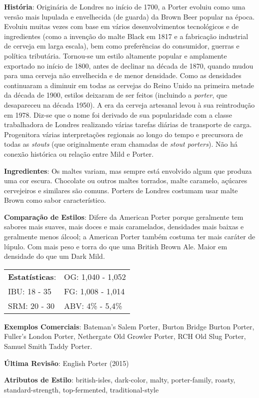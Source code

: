\textbf{História}: Originária de Londres no início de 1700, a Porter evoluiu como uma versão mais lupulada e envelhecida (de guarda) da Brown Beer popular na época. Evoluiu muitas vezes com base em vários desenvolvimentos tecnológicos e de ingredientes (como a invenção do malte Black em 1817 e a fabricação industrial de cerveja em larga escala), bem como preferências do consumidor, guerras e política tributária. Tornou-se um estilo altamente popular e amplamente exportado no início de 1800, antes de declinar na década de 1870, quando mudou para uma cerveja não envelhecida e de menor densidade. Como as densidades continuaram a diminuir em todas as cervejas do Reino Unido na primeira metade da década de 1900, estilos deixaram de ser feitos (incluindo a \textit{porter}, que desapareceu na década 1950). A era da cerveja artesanal levou à sua reintrodução em 1978. Diz-se que o nome foi derivado de sua popularidade com a classe trabalhadora de Londres realizando várias tarefas diárias de transporte de carga. Progenitora várias interpretações regionais ao longo do tempo e precursora de todas as \textit{stouts} (que originalmente eram chamadas de \textit{stout porters}). Não há conexão histórica ou relação entre Mild e Porter.

\textbf{Ingredientes}: Os maltes variam, mas sempre está envolvido algum que produza uma cor escura. Chocolate ou outros maltes torrados, malte caramelo, açúcares cervejeiros e similares são comuns. Porters de Londres costumam usar malte Brown como sabor característico.

\textbf{Comparação de Estilos}: Difere da American Porter porque geralmente tem sabores mais suaves, mais doces e mais caramelados, densidades mais baixas e geralmente menos álcool; a American Porter também costuma ter mais caráter de lúpulo. Com mais peso e torra do que uma British Brown Ale. Maior em densidade do que um Dark Mild.

\begin{tabular}{@{}p{35mm}p{35mm}@{}}
  \textbf{Estatísticas}: & OG: 1,040 - 1,052 \\
  IBU: 18 - 35  & FG: 1,008 - 1,014  \\
  SRM: 20 - 30  & ABV: 4\% - 5,4\%
\end{tabular}

\textbf{Exemplos Comerciais}: Bateman’s Salem Porter, Burton Bridge Burton Porter, Fuller's London Porter, Nethergate Old Growler Porter, RCH Old Slug Porter, Samuel Smith Taddy Porter.

\textbf{Última Revisão}: English Porter (2015)

\textbf{Atributos de Estilo}: british-isles, dark-color, malty, porter-family, roasty, standard-strength, top-fermented, traditional-style
